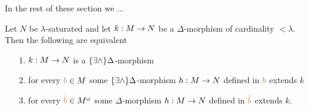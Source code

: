 In the rest of these section we ... 

% 

\begin{proposition}\label{prop_EDelta_estensione}
Let $N$ be $\lambda$-saturated and let $k:M\rightarrow N$ be a $\Delta$-morphism of cardinality $<\lambda$. Then the following are equivalent
\begin{itemize}
\item[1.] $k:M\rightarrow N$ is a $\{\exists\wedge\}\Delta$-morphism
\item[2.] for every ${\color{brown} b}\in M$ some $\{\exists\wedge\}\Delta$-morphism $h:M\rightarrow N$ defined in ${\color{brown} b}$ extends $k$
\item[3.] for every ${\color{brown}\bar b}\in M^{\omega}$ some $\Delta$-morphism $h:M\rightarrow N$ defined in ${\color{brown}\bar b}$ extends $k$.
\end{itemize}
\end{proposition}

